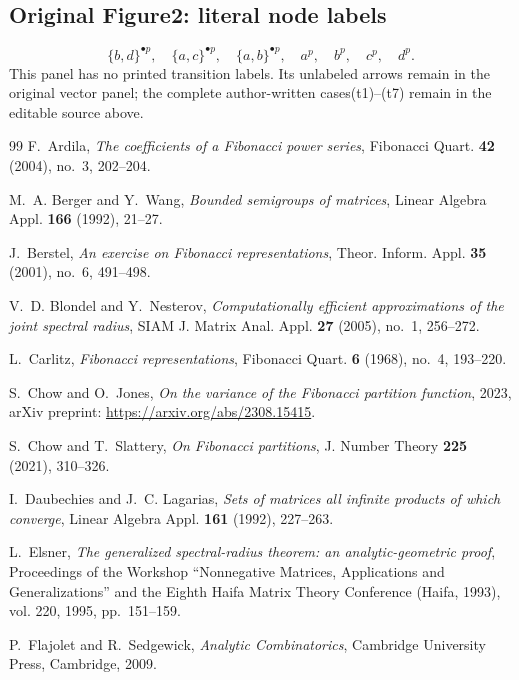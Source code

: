 \documentclass[11pt]{article}
\theoremstyle{remark}\newtheorem{remark}[theorem]{Remark}
\begin{document}
\subsection*{Original Figure2: literal node labels}
\[\{b,d\}^{\bullet p},\quad \{a,c\}^{\bullet p},\quad \{a,b\}^{\bullet p},\quad a^p,\quad b^p,\quad c^p,\quad d^p.\]
This panel has no printed transition labels. Its unlabeled arrows remain in the original vector panel; the complete author-written cases(t1)--(t7) remain in the editable source above.
\begin{thebibliography}{99}
	F.~Ardila, \emph{The coefficients of a {F}ibonacci power series}, Fibonacci
	Quart. \textbf{42} (2004), no.~3, 202--204.
	
	M.~A. Berger and Y.~Wang, \emph{Bounded semigroups of matrices}, Linear Algebra
	Appl. \textbf{166} (1992), 21--27.
	
	J.~Berstel, \emph{An exercise on {F}ibonacci representations}, Theor. Inform.
	Appl. \textbf{35} (2001), no.~6, 491--498.
	
	V.~D. Blondel and Y.~Nesterov, \emph{Computationally efficient approximations
		of the joint spectral radius}, SIAM J. Matrix Anal. Appl. \textbf{27} (2005),
	no.~1, 256--272.
	
	L.~Carlitz, \emph{Fibonacci representations}, Fibonacci Quart. \textbf{6}
	(1968), no.~4, 193--220.
	
	S.~Chow and O.~Jones, \emph{On the variance of the {F}ibonacci partition
		function}, 2023, arXiv preprint: \url{https://arxiv.org/abs/2308.15415}.
	
	S.~Chow and T.~Slattery, \emph{On {F}ibonacci partitions}, J. Number Theory
	\textbf{225} (2021), 310--326.
	
	I.~Daubechies and J.~C. Lagarias, \emph{Sets of matrices all infinite products
		of which converge}, Linear Algebra Appl. \textbf{161} (1992), 227--263.
	
	L.~Elsner, \emph{The generalized spectral-radius theorem: an analytic-geometric
		proof}, Proceedings of the {W}orkshop ``{N}onnegative {M}atrices,
	{A}pplications and {G}eneralizations'' and the {E}ighth {H}aifa {M}atrix
	{T}heory {C}onference ({H}aifa, 1993), vol. 220, 1995, pp.~151--159.
	
	P.~Flajolet and R.~Sedgewick, \emph{Analytic {C}ombinatorics}, Cambridge
	University Press, Cambridge, 2009.
	

\end{thebibliography}
\end{document}
